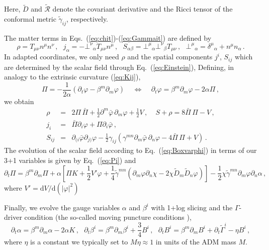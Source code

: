 \documentclass[]{iopart}
\newcommand{\du}{\mathrm{d}}
\begin{document}
%
Here, $\tilde{D}$ and $\tilde{\mathcal{R}}$ denote the covariant
derivative and the Ricci tensor of the conformal metric
$\tilde{\gamma}_{ij}$, respectively.

The matter terms in Eqs.~(\ref{eq:chit})-(\ref{eq:Gammait}) are
defined by
%
\begin{equation}
  \rho = T_{\mu\nu}n^{\mu}n^{\nu}\,,~~~
  j_{\alpha} = -\bot^{\nu}{}_{\alpha} T_{\mu\nu} n^{\mu}\,,~~~
  S_{\alpha\beta} = \bot^{\mu}{}_{\alpha} \bot^{\nu}{}_{\beta}
        T_{\mu\nu}\,,~~~
  \bot^{\mu}{}_{\alpha}=\delta^{\mu}{}_{\alpha}+n^{\mu}n_{\alpha}\,.
\end{equation}
%
In adapted coordinates, we only need $\rho$ and the spatial components
$j^i$, $S_{ij}$ which are determined by the scalar field through
Eq.~(\ref{eq:Einstein}), Defining, in analogy to the extrinsic
curvature (\ref{eq:Kij}),
%
\begin{equation}
  \Pi = -\frac{1}{2\alpha}
  (
  \partial_t \varphi - \beta^m \partial_m \varphi
  )
  ~~~~~\Leftrightarrow~~~~~
  \partial_t \varphi = \beta^m\partial_m \varphi-2\alpha \Pi\,,
  \label{eq:Pi}
\end{equation}
%
we obtain
%
\begin{eqnarray}
  \rho &=&
  2\Pi \,\bar{\Pi}
  +\frac{1}{2}\partial^m \bar{\varphi}\,\partial_m\varphi
  +\frac{1}{2}V\,,~~~~~
  S+\rho = 8\bar{\Pi}\,\Pi-V\,, \nonumber \\
  j_i &=&
  \bar{\Pi}\partial_i \varphi
  +\Pi \partial_i \bar{\varphi}\,, \nonumber\\
  S_{ij} &=& \partial_{(i}\bar{\varphi}\partial_{j)}\varphi
  - \frac{1}{2}\gamma_{ij}
  \left(
  \gamma^{mn}\partial_m \bar{\varphi}\,\partial_n \varphi
  -4\bar{\Pi} \,\Pi
  +V
  \right)\,. \label{eqn:projectionofstressenergy}
\end{eqnarray}
%
The evolution of the scalar field according to Eq.~(\ref{eq:Boxvarphi})
in terms of our 3+1 variables is given by Eq.~(\ref{eq:Pi}) and
%
\begin{equation}
  \partial_t \Pi =
  \beta^m \partial_m \Pi
  + \alpha
  \left[
  \Pi K
  + \frac{1}{2}V'\varphi
  + \frac{1}{4} \tilde{\gamma}^{mn}
  \left(
  \partial_m \varphi\partial_n\chi
  -2\chi\tilde{D}_m\tilde{D}_n \varphi
  \right)
  \right]
  -\frac{1}{2} \chi\tilde{\gamma}^{mn}\partial_m\varphi
  \partial_n \alpha
  \,,
\end{equation}
%
where $V'=\du V/\du (|\varphi|^2)$

Finally, we evolve the gauge variables $\alpha$ and $\beta^i$ with
1+log slicing and the $\Gamma$-driver condition (the so-called
moving puncture conditions \cite{Campanelli:2005dd,Baker:2005vv}),
%
\begin{equation}
  \partial_t \alpha = \beta^m \partial_m \alpha
  -2\alpha K
  \,,~~~
  \partial_t \beta^i = \beta^m\partial_m \beta^i
  +\frac{3}{4}B^i
  \,,~~~
  \partial_t B^i = \beta^m \partial_m B^i
  +\partial_t \tilde{\Gamma}^i
  -\eta B^i\,,
\end{equation}
%
where $\eta$ is a constant we typically set to $M\eta\approx 1$ in
units of the ADM mass $M$.
\end{document}
